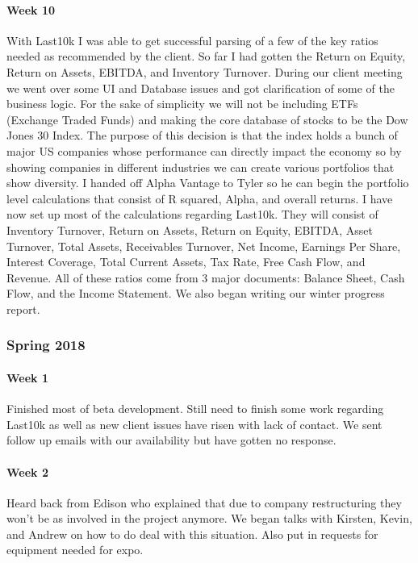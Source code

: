 \documentclass[onecolumn, draftclsnofoot,10pt, compsoc]{IEEEtran}
\begin{document}
    \paragraph{Week 10} 
    With Last10k I was able to get successful parsing of a few of the key ratios needed as recommended by the client. So far I had gotten the Return on Equity, Return on Assets, EBITDA, and Inventory Turnover. During our client meeting we went over some UI and Database issues and got clarification of some of the business logic. For the sake of simplicity we will not be including ETFs (Exchange Traded Funds) and making the core database of stocks to be the Dow Jones 30 Index. The purpose of this decision is that the index holds a bunch of major US companies whose performance can directly impact the economy so by showing companies in different industries we can create various portfolios that show diversity. I handed off Alpha Vantage to Tyler so he can begin the portfolio level calculations that consist of R squared, Alpha, and overall returns. I have now set up most of the calculations regarding Last10k. They will consist of  Inventory Turnover, Return on Assets, Return on Equity, EBITDA, Asset Turnover, Total Assets, Receivables Turnover, Net Income, Earnings Per Share, Interest Coverage, Total Current Assets, Tax Rate, Free Cash Flow, and Revenue. All of these ratios come from 3 major documents: Balance Sheet, Cash Flow, and the Income Statement. We also began writing our winter progress report. 
    
\subsubsection{Spring 2018} 
    \paragraph{Week 1} 
    Finished most of beta development. Still need to finish some work regarding Last10k as well as new client issues have risen with lack of contact. We sent follow up emails with our availability but have gotten no response.

    \paragraph{Week 2} 
    Heard back from Edison who explained that due to company restructuring they won't be as involved in the project anymore. We began talks with Kirsten, Kevin, and Andrew on how to do deal with this situation. Also put in requests for equipment needed for expo. 
\end{document}
